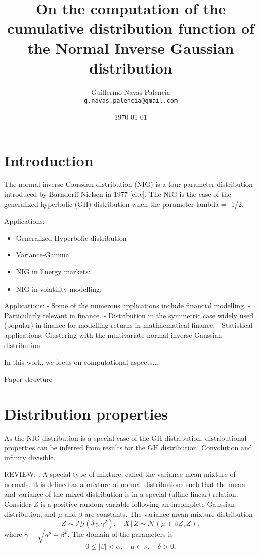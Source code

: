 \documentclass[10pt,a4paper,oneside]{article}
\title{On the computation of the cumulative distribution function of the Normal Inverse Gaussian distribution}
\author{
 \normalsize  Guillermo Navas-Palencia\\
  \texttt{\normalsize  g.navas.palencia@gmail.com}
}
\date{\small \today}
\numberwithin{equation}{section}
\begin{document}
\maketitle

\section{Introduction}

The normal inverse Gaussian distribution (NIG) is a four-parameter distribution introduced by Barndorff-Nielsen in 1977 [cite].  The NIG is the case of the
generalized hyperbolic (GH) distribution when the parameter lambda = -1/2.

Applications:
\begin{itemize}
\item Generalized Hyperbolic distribution \cite{Prause1999}
\item Variance-Gamma \cite{Madan1990}
\item NIG in Energy markets: \cite{Benth2004}
\item NIG in volatility modelling: \cite{Barndorff1997}
\end{itemize}

Applications:
- Some of the numerous applications include financial modelling.
- Particularly relevant in finance.
- Distribution in the symmetric case widely used (popular) in finance for modelling returns in mathhematical finance.
- Statistical applications: Clustering with the multivariate normal inverse Gaussian distribution

In this work, we focus on computational aspects...

Paper structure


\section{Distribution properties}

As the NIG distribution is a special case of the GH distribution, distributional properties can be inferred from results for the GH distribution.
Convolution and infinity divisible.


REVIEW: \cite{Paolella2007}. A special type of mixture, called the variance-mean mixture of normals. It is defined as a mixture of normal distributions such that the mean and variance of the mixed distribution is in a special (affine-linear) relation. Consider $Z$ is a positive random variable following an incomplete Gaussian distribution, and $\mu$ and $\beta$ are constants. The variance-mean mixture distribution
\begin{equation}
Z \sim \mathcal{IG}(\delta \gamma, \gamma^2), \quad X \,|\, Z \sim \mathcal{N}(\mu + \beta Z, Z),
\end{equation}
where $\gamma = \sqrt{\alpha^2 - \beta^2}$. The domain of the parameters is
\begin{equation}
0 \le |\beta| < \alpha, \quad \mu \in \mathbb{R}, \quad \delta  > 0.
\end{equation}
\end{document}
